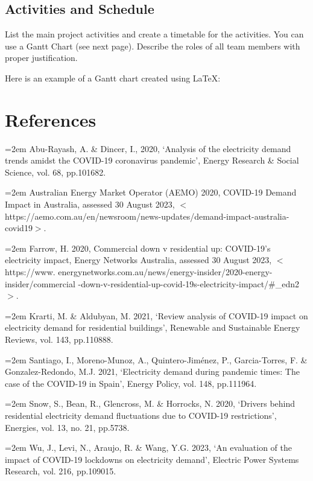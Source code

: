 \documentclass[mstat,12pt]{unswthesis}
\begin{document}
\hypertarget{activities-and-schedule}{%
\section{Activities and Schedule}\label{activities-and-schedule}}

List the main project activities and create a timetable for the
activities. You can use a Gantt Chart (see next page). Describe the
roles of all team members with proper justification.

\newpage

Here is an example of a Gantt chart created using \LaTeX:

\bigskip

\hypertarget{references}{%
\chapter*{References}\label{references}}




\hypertarget{refs}{}

\leavevmode{}%

\hangindent=2em
Abu-Rayash, A. \& Dincer, I., 2020, ‘Analysis of the electricity demand trends amidst the COVID-19 coronavirus pandemic’, Energy Research \& Social Science, vol. 68, pp.101682. \hfill\break

\hangindent=2em
\noindent Australian Energy Market Operator (AEMO) 2020, COVID-19 Demand Impact in Australia, assessed 30 August 2023, $<$https://aemo.com.au/en/newsroom/news-updates/demand-impact-australia-covid19$>$. \hfill\break

\hangindent=2em
\noindent Farrow, H. 2020, Commercial down v residential up: COVID-19’s electricity impact, Energy Networks Australia, assessed 30 August 2023, $<$https://www. energynetworks.com.au/news/energy-insider/2020-energy-insider/commercial -down-v-residential-up-covid-19s-electricity-impact/\#\_edn2$>$. \hfill\break

\hangindent=2em
\noindent Krarti, M. \& Aldubyan, M. 2021, ‘Review analysis of COVID-19 impact on electricity demand for residential buildings’, Renewable and Sustainable Energy Reviews, vol. 143, pp.110888. \hfill\break

\hangindent=2em
\noindent Santiago, I., Moreno-Munoz, A., Quintero-Jiménez, P., Garcia-Torres, F. \& Gonzalez-Redondo, M.J. 2021, ‘Electricity demand during pandemic times: The case of the COVID-19 in Spain’, Energy Policy, vol. 148, pp.111964. \hfill\break

\hangindent=2em
\noindent Snow, S., Bean, R., Glencross, M. \& Horrocks, N. 2020, ‘Drivers behind residential electricity demand fluctuations due to COVID-19 restrictions’, Energies, vol. 13, no. 21, pp.5738. \hfill\break

\hangindent=2em
\noindent Wu, J., Levi, N., Araujo, R. \& Wang, Y.G. 2023, ‘An evaluation of the impact of COVID-19 lockdowns on electricity demand’, Electric Power Systems Research, vol. 216, pp.109015. \hfill\break
\end{document}
